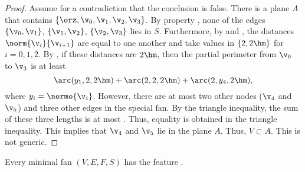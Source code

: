 \begin{proof} %
Assume for a contradiction that the conclusion is false.  There is a
plane $A$ that contains $\{\orz,\v_0,\v_1,\v_2,\v_3\}$.  By property
, none of the edges $\{\v_0,\v_1\}$, $\{\v_1,\v_2\}$,
$\{\v_2,\v_3\}$ lies in $S$.  Furthermore, by 
and , the distances $\norm{\v_i}{\v_{i+1}}$ are equal
to one another and take values in $\{2,2\hm\}$ for $i=0,1,2$.  By
, if these distances are $2\hm$, then the partial
perimeter from $\v_0$ to $\v_3$ is at least
\begin{equation}\label{eqn:3side}
\arc(y_1,2,2\hm)+\arc(2,2,2\hm)+\arc(2,y_4,2\hm),
\end{equation}
where $y_i=\normo{\v_i}$.  However, there are at most two other nodes
($\v_4$ and $\v_5$) and three other edges in the special fan.  By the
triangle inequality, the sum of these three lengths is at most
.  Thus, equality is obtained in the triangle
inequality.  This implies that $\v_4$ and $\v_5$ lie in the plane $A$.
Thus, $V\subset A$.  This is not generic.
\end{proof}

\begin{lemma}\label{l:fext}
Every minimal fan $(V,E,F,S)$ has the feature .
\end{lemma}

